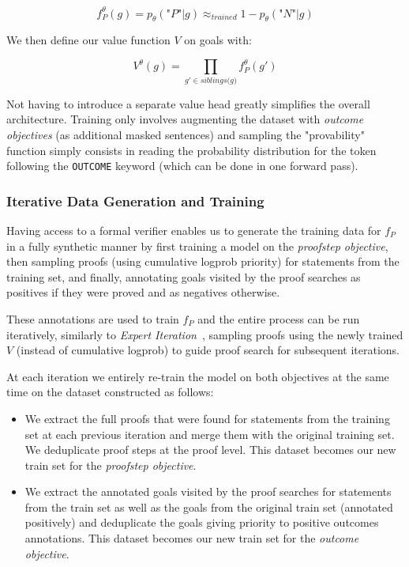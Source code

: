 \documentclass{article}
\begin{document}
$$
f_{P}^{\theta}(g) = p_{\theta}(\textit{"P"}|g) \approx_{\textit{trained}}
1-p_{\theta}(\textit{"N"}|g)
$$

We then define our value function $V$ on goals with:

$$
V^{\theta}(g) = \prod_{g' \in \textit{siblings(g)}} f_{P}^{\theta}(g')
$$

Not having to introduce a separate value head greatly simplifies the overall architecture. Training only involves augmenting the dataset with \textit{outcome objectives} (as additional masked sentences) and sampling the "provability" function simply consists in reading the probability distribution for the token following the \verb|OUTCOME| keyword (which can be done in one forward pass).

\subsubsection{Iterative Data Generation and Training}

Having access to a formal verifier enables us to generate the training data for $f_P$ in a fully synthetic manner by first training a model on the \textit{proofstep objective}, then sampling proofs (using cumulative logprob priority) for statements from the training set, and finally, annotating goals visited by the proof searches as positives if they were proved and as negatives otherwise.

These annotations are used to train $f_P$ and the entire process can be run iteratively, similarly to \textit{Expert Iteration}~\cite{anthony2017thinking}, sampling proofs using the newly trained $V$ (instead of cumulative logprob) to guide proof search for subsequent iterations.

At each iteration we entirely re-train the model on both objectives at the same time on the dataset constructed as follows:

\begin{itemize}
    \item  We extract the full proofs that were found for statements from the training set at each previous iteration and merge them with the original training set. We deduplicate proof steps at the proof level. This dataset becomes our new train set for the \textit{proofstep objective}.
    \item We extract the annotated goals visited by the proof searches for statements from the train set as well as the goals from the original train set (annotated positively) and deduplicate the goals giving priority to positive outcomes annotations. This dataset becomes our new train set for the \textit{outcome objective}.
\end{itemize}
\end{document}
